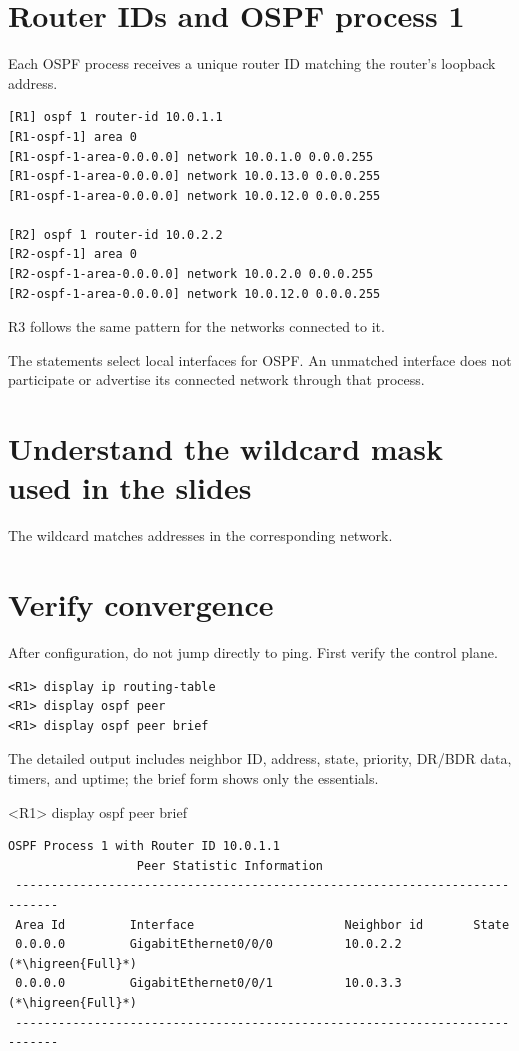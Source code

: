 \section{Router IDs and OSPF process 1}
Each OSPF process receives a unique router ID matching the router's loopback address.

\begin{lstlisting}[style=dcnterminal]
[R1] ospf 1 router-id 10.0.1.1
[R1-ospf-1] area 0
[R1-ospf-1-area-0.0.0.0] network 10.0.1.0 0.0.0.255
[R1-ospf-1-area-0.0.0.0] network 10.0.13.0 0.0.0.255
[R1-ospf-1-area-0.0.0.0] network 10.0.12.0 0.0.0.255

[R2] ospf 1 router-id 10.0.2.2
[R2-ospf-1] area 0
[R2-ospf-1-area-0.0.0.0] network 10.0.2.0 0.0.0.255
[R2-ospf-1-area-0.0.0.0] network 10.0.12.0 0.0.0.255
\end{lstlisting}
R3 follows the same pattern for the networks connected to it.

\begin{keyidea}
The  statements select local interfaces for OSPF. An unmatched interface does not participate or advertise its connected network through that process.
\end{keyidea}

\section{Understand the wildcard mask used in the slides}
The wildcard  matches addresses in the corresponding  network.

\section{Verify convergence}
After configuration, do not jump directly to ping. First verify the control plane.
\begin{lstlisting}[style=dcnterminal]
<R1> display ip routing-table
<R1> display ospf peer
<R1> display ospf peer brief
\end{lstlisting}
The detailed output includes neighbor ID, address, state, priority, DR/BDR data, timers, and uptime; the brief form shows only the essentials.

\begin{vrpbox}{<R1> display ospf peer brief}
\begin{lstlisting}[style=dcnvrp]
         OSPF Process 1 with Router ID 10.0.1.1
                  Peer Statistic Information
 ----------------------------------------------------------------------------
 Area Id         Interface                     Neighbor id       State
 0.0.0.0         GigabitEthernet0/0/0          10.0.2.2          (*\higreen{Full}*)
 0.0.0.0         GigabitEthernet0/0/1          10.0.3.3          (*\higreen{Full}*)
 ----------------------------------------------------------------------------
\end{lstlisting}
\end{vrpbox}

